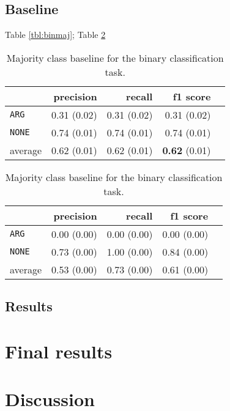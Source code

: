 \subsection{Baseline}
Table \ref{tbl:binmaj}; Table \ref{tbl:binstrat}


\begin{table}[!htb]
    \begin{minipage}{.5\linewidth}
      \caption{Random (stratified) baseline for the binary classification task.}
      \label{tbl:binmaj}
      \centering
      
\begin{tabular}{@{}lrrrr@{}}
\toprule
 	&	 precision &	 recall &	 f1 score  \\ \midrule 
\texttt{ARG}	&	 0.31 \scriptsize{(0.02)} &	 0.31 \scriptsize{(0.02)} &	 0.31 \scriptsize{(0.02)}  \\ 
\texttt{NONE}	&	 0.74 \scriptsize{(0.01)} &	 0.74 \scriptsize{(0.01)} &	 0.74 \scriptsize{(0.01)}  \\ 
average	&	 0.62 \scriptsize{(0.01)} &	 0.62 \scriptsize{(0.01)} &	 \textbf{0.62} \scriptsize{(0.01)}  \\ 
\bottomrule
\end{tabular}

  \end{minipage}%
    \begin{minipage}{.5\linewidth}
      \centering
        \caption{Majority class baseline for the binary classification task.}
        \label{tbl:binstrat}
\begin{tabular}{@{}lrrrr@{}}
\toprule
 	&	 precision &	 recall &	 f1 score  \\ \midrule 
\texttt{ARG}	&	 0.00 \scriptsize{(0.00)} &	 0.00 \scriptsize{(0.00)} &	 0.00 \scriptsize{(0.00)}  \\ 
\texttt{NONE}	&	 0.73 \scriptsize{(0.00)} &	 1.00 \scriptsize{(0.00)} &	 0.84 \scriptsize{(0.00)}  \\ 
average	&	 0.53 \scriptsize{(0.00)} &	 0.73 \scriptsize{(0.00)} &	 0.61 \scriptsize{(0.00)}  \\ 
\bottomrule
\end{tabular}
    \end{minipage} 
\end{table}







\subsection{Results}

\section{Final results}
\label{sec:final}

\section{Discussion}